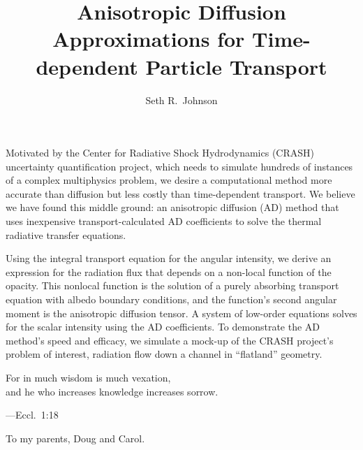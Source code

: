 \documentclass[12pt,letterpaper,twoside]{umthesis}
\author{Seth R.~Johnson}
\title{Anisotropic Diffusion Approximations for Time-dependent Particle
Transport}
\begin{document}
\allowdisplaybreaks
\setlength{\parskip}{0pt plus 0pt minus 0pt}

\frontmatter

\maketitle

\begin{finalabstract}
Motivated by the Center for Radiative Shock Hydrodynamics (CRASH) uncertainty
quantification project, which needs to simulate hundreds of instances of a
complex multiphysics problem, we desire a computational method more accurate
than diffusion
but less costly than time-dependent transport. We believe we have found this
middle ground: an anisotropic diffusion (AD) method that uses inexpensive
transport-calculated AD coefficients to solve the thermal radiative transfer
equations.

Using the integral transport equation for the angular intensity, we derive an
expression for the radiation flux that depends on a non-local function of the
opacity. This nonlocal function is the solution of a purely absorbing transport
equation with albedo boundary conditions, and the function's second angular
moment is the anisotropic diffusion tensor. A system of low-order equations
solves for the scalar intensity using the AD coefficients. To demonstrate the
AD method's speed and efficacy, we simulate a mock-up of the CRASH project's
problem of interest, radiation flow down a channel in ``flatland'' geometry.

\end{finalabstract}
\makecopyright

\begin{frontispiece}
\begin{flushleft}
For in much wisdom is much vexation,\hfill\\
\hspace{1.5em}and he who increases knowledge increases sorrow.
\end{flushleft}
---Eccl.~1:18
\end{frontispiece}

\begin{dedication}
  To my parents, Doug and Carol.
\end{dedication}
\end{document}
